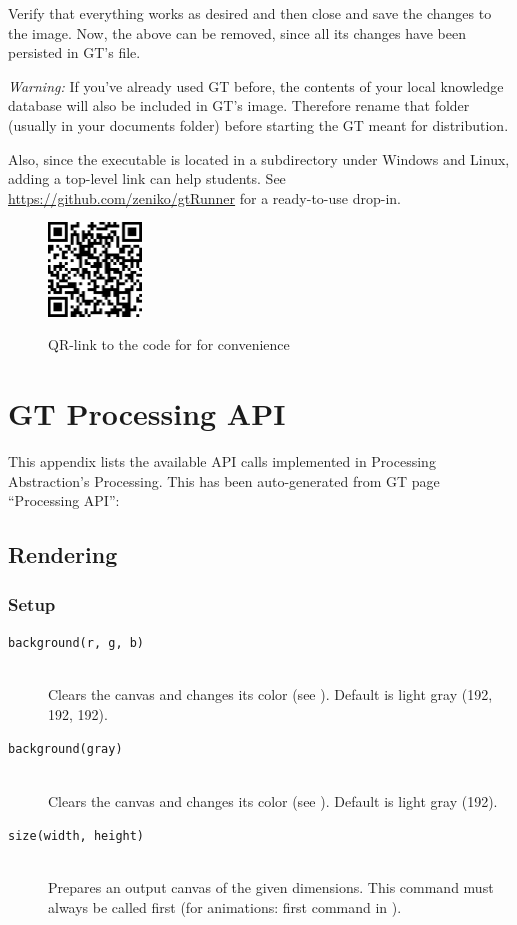 Verify that everything works as desired and then close and save the changes to the image. Now, the above  can be removed, since all its changes have been persisted in GT's  file.

\emph{Warning:} If you've already used GT before, the contents of your local knowledge database will also be included in GT's image. Therefore rename that folder (usually  in your documents folder) before starting the GT meant for distribution.

Also, since the executable  is located in a subdirectory under Windows and Linux, adding a top-level link can help students. See \url{https://github.com/zeniko/gtRunner} for a ready-to-use drop-in.

\begin{figure} \label{fig_startup_st_qr}
\centering
\href{https://github.com/zeniko/gyminf-thesis/blob/main/appendix.tex}{\includegraphics[height=2.5cm]{images/startup.st}}
\lessSpace
\caption{QR-link to the code for  for convenience}
\end{figure}



\chapter{GT Processing API} \label{app_api}

This appendix lists the available API calls implemented in Processing Abstraction's Processing. This has been auto-generated from GT page ``Processing API'':

\section{Rendering}

\subsection{Setup}
\begin{description}
\item[\texttt{background(r, g, b)}] \hfill \\
	Clears the canvas and changes its color (see ). Default is light gray (192, 192, 192).
\item[\texttt{background(gray)}] \hfill \\
	Clears the canvas and changes its color (see ). Default is light gray (192).
\item[\texttt{size(width, height)}] \hfill \\
	Prepares an output canvas of the given dimensions. This command must always be called first (for animations: first command in ).
\end{description}

